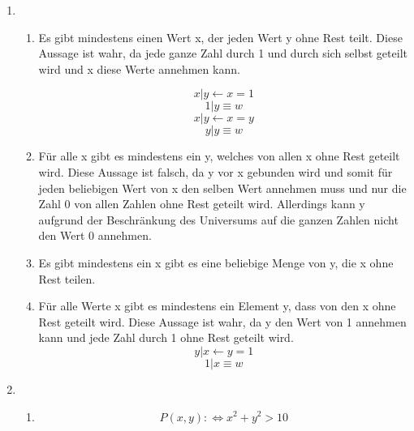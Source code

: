 \documentclass[a4paper]{article}
\begin{document}
	\begin{enumerate}
		\item
		\begin{enumerate}
			\item
			Es gibt mindestens einen Wert x, der jeden Wert y ohne Rest teilt.
			\newline
			Diese Aussage ist wahr, da jede ganze Zahl durch 1 und durch sich selbst geteilt wird und x diese Werte annehmen kann.
			
			\begin{equation*}
				x | y \leftarrow x = 1
			\end{equation*}
			\begin{equation*}
				1 | y \equiv w
			\end{equation*}
			\begin{equation*}
				x | y \leftarrow x = y
			\end{equation*}
			\begin{equation*}
				y | y \equiv w
			\end{equation*}
			
			\item
			Für alle x gibt es mindestens ein y, welches von allen x ohne Rest geteilt wird.
			\newline
			Diese Aussage ist falsch, da y vor x gebunden wird und somit für jeden beliebigen Wert von x den selben Wert annehmen muss und nur die Zahl 0 von allen Zahlen ohne Rest geteilt wird. Allerdings kann y aufgrund der Beschränkung des Universums auf die ganzen Zahlen nicht den Wert 0 annehmen.
			
			\item
			Es gibt mindestens ein x gibt es eine beliebige Menge von y, die x ohne Rest teilen.
			\newline
			
			
			\item
			Für alle Werte x gibt es mindestens ein Element y, dass von den x ohne Rest geteilt wird.
			\newline
			Diese Aussage ist wahr, da y den Wert von 1 annehmen kann und jede Zahl durch 1 ohne Rest geteilt wird.
			\begin{equation*}
				y | x \leftarrow y = 1
			\end{equation*}
			\begin{equation*}
				1 | x \equiv w
			\end{equation*}
		\end{enumerate}
		
		\item
		\begin{enumerate}
			\item
			\begin{equation*}
				P(x, y) :\Leftrightarrow x^{2} + y^{2} > 10
			\end{equation*}
			

\end{enumerate}
\end{enumerate}
\end{document}
